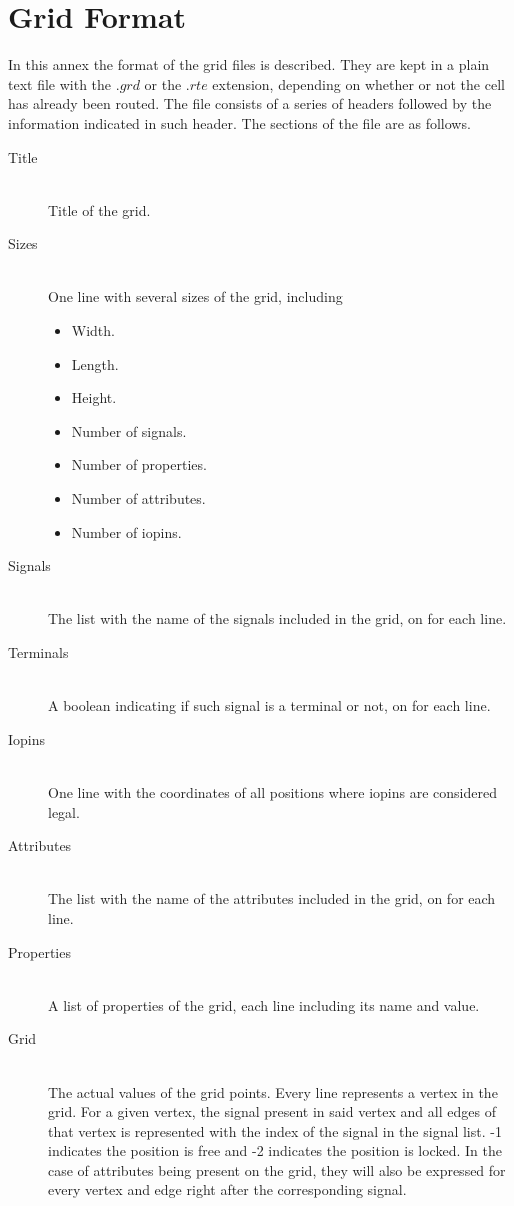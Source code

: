 \chapter{Grid Format}
\label{cha:gridformat}

In this annex the format of the grid files is described. They are kept in a plain text file with the $.grd$ or the $.rte$ extension, depending on whether or not the cell has already been routed. The file consists of a series of headers followed by the information indicated in such header. The sections of the file are as follows.

\begin{description}
  \item[Title] \hfill \\
  Title of the grid.
  \item[Sizes] \hfill \\
  One line with several sizes of the grid, including
  	\begin{itemize}
  		\item Width.
  		\item Length.
  		\item Height.
  		\item Number of signals.
  		\item Number of properties.
  		\item Number of attributes.
  		\item Number of iopins.
  	\end{itemize}
  \item[Signals] \hfill \\
  The list with the name of the signals included in the grid, on for each line.
  \item[Terminals] \hfill \\
  A boolean indicating if such signal is a terminal or not, on for each line.
  \item[Iopins] \hfill \\
  One line with the coordinates of all positions where iopins are considered legal.
  \item[Attributes] \hfill \\
  The list with the name of the attributes included in the grid, on for each line.
  \item[Properties] \hfill \\
  A list of properties of the grid, each line including its name and value.
  \item[Grid] \hfill \\
  The actual values of the grid points. Every line represents a vertex in the grid. For a given vertex, the signal present in said vertex and all edges of that vertex is represented with the index of the signal in the signal list. -1 indicates the position is free and -2 indicates the position is locked. In the case of attributes being present on the grid, they will also be expressed for every vertex and edge right after the corresponding signal. 
\end{description}
  
